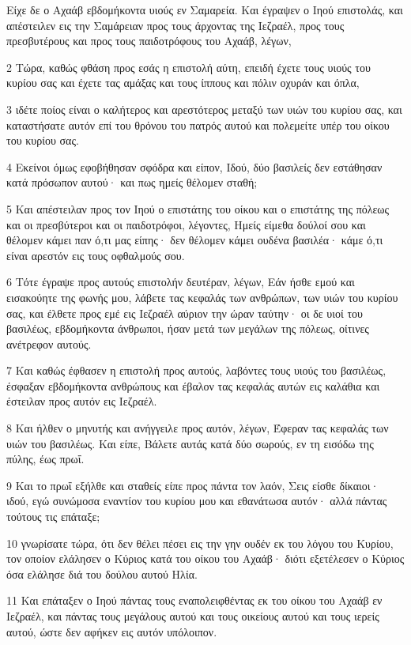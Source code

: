 \par Είχε δε ο Αχαάβ εβδομήκοντα υιούς εν Σαμαρεία. Και έγραψεν ο Ιηού επιστολάς, και απέστειλεν εις την Σαμάρειαν προς τους άρχοντας της Ιεζραέλ, προς τους πρεσβυτέρους και προς τους παιδοτρόφους του Αχαάβ, λέγων,
\par 2 Τώρα, καθώς φθάση προς εσάς η επιστολή αύτη, επειδή έχετε τους υιούς του κυρίου σας και έχετε τας αμάξας και τους ίππους και πόλιν οχυράν και όπλα,
\par 3 ιδέτε ποίος είναι ο καλήτερος και αρεστότερος μεταξύ των υιών του κυρίου σας, και καταστήσατε αυτόν επί του θρόνου του πατρός αυτού και πολεμείτε υπέρ του οίκου του κυρίου σας.
\par 4 Εκείνοι όμως εφοβήθησαν σφόδρα και είπον, Ιδού, δύο βασιλείς δεν εστάθησαν κατά πρόσωπον αυτού· και πως ημείς θέλομεν σταθή;
\par 5 Και απέστειλαν προς τον Ιηού ο επιστάτης του οίκου και ο επιστάτης της πόλεως και οι πρεσβύτεροι και οι παιδοτρόφοι, λέγοντες, Ημείς είμεθα δούλοί σου και θέλομεν κάμει παν ό,τι μας είπης· δεν θέλομεν κάμει ουδένα βασιλέα· κάμε ό,τι είναι αρεστόν εις τους οφθαλμούς σου.
\par 6 Τότε έγραψε προς αυτούς επιστολήν δευτέραν, λέγων, Εάν ήσθε εμού και εισακούητε της φωνής μου, λάβετε τας κεφαλάς των ανθρώπων, των υιών του κυρίου σας, και έλθετε προς εμέ εις Ιεζραέλ αύριον την ώραν ταύτην· οι δε υιοί του βασιλέως, εβδομήκοντα άνθρωποι, ήσαν μετά των μεγάλων της πόλεως, οίτινες ανέτρεφον αυτούς.
\par 7 Και καθώς έφθασεν η επιστολή προς αυτούς, λαβόντες τους υιούς του βασιλέως, έσφαξαν εβδομήκοντα ανθρώπους και έβαλον τας κεφαλάς αυτών εις καλάθια και έστειλαν προς αυτόν εις Ιεζραέλ.
\par 8 Και ήλθεν ο μηνυτής και ανήγγειλε προς αυτόν, λέγων, Έφεραν τας κεφαλάς των υιών του βασιλέως. Και είπε, Βάλετε αυτάς κατά δύο σωρούς, εν τη εισόδω της πύλης, έως πρωΐ.
\par 9 Και το πρωΐ εξήλθε και σταθείς είπε προς πάντα τον λαόν, Σεις είσθε δίκαιοι· ιδού, εγώ συνώμοσα εναντίον του κυρίου μου και εθανάτωσα αυτόν· αλλά πάντας τούτους τις επάταξε;
\par 10 γνωρίσατε τώρα, ότι δεν θέλει πέσει εις την γην ουδέν εκ του λόγου του Κυρίου, τον οποίον ελάλησεν ο Κύριος κατά του οίκου του Αχαάβ· διότι εξετέλεσεν ο Κύριος όσα ελάλησε διά του δούλου αυτού Ηλία.
\par 11 Και επάταξεν ο Ιηού πάντας τους εναπολειφθέντας εκ του οίκου του Αχαάβ εν Ιεζραέλ, και πάντας τους μεγάλους αυτού και τους οικείους αυτού και τους ιερείς αυτού, ώστε δεν αφήκεν εις αυτόν υπόλοιπον.
